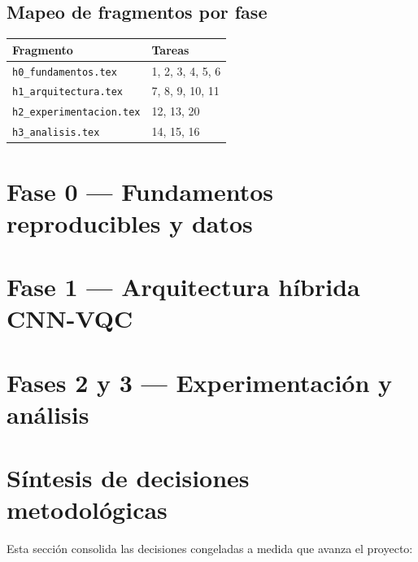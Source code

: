 \documentclass[12pt,letterpaper]{article}
\begin{document}
\subsection{Mapeo de fragmentos por fase}

\begin{tabularx}{\textwidth}{|l|X|}\hline
\textbf{Fragmento} & \textbf{Tareas} \\\hline
\texttt{h0\_fundamentos.tex} & 1, 2, 3, 4, 5, 6 \\\hline
\texttt{h1\_arquitectura.tex} & 7, 8, 9, 10, 11 \\\hline
\texttt{h2\_experimentacion.tex} & 12, 13, 20 \\\hline
\texttt{h3\_analisis.tex} & 14, 15, 16 \\\hline
\end{tabularx}

\section{Fase 0 — Fundamentos reproducibles y datos}


\section{Fase 1 — Arquitectura híbrida CNN-VQC}


\section{Fases 2 y 3 — Experimentación y análisis}



\section{Síntesis de decisiones metodológicas}

Esta sección consolida las decisiones congeladas a medida que avanza el proyecto:
\end{document}
